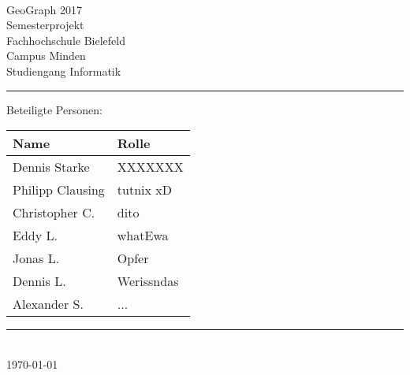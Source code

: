 


\begin{titlepage}
   \mbox{}\vspace{5\baselineskip}\\
   \sffamily\huge
   \centering
   {\Huge GeoGraph 2017} \\
   \normalsize Semesterprojekt
   \vspace{3\baselineskip}\\
   \rmfamily\Large
  Fachhochschule Bielefeld \\
  Campus Minden \\
  Studiengang Informatik
   \vspace{2\baselineskip}\\
\noindent\rule{15cm}{0.4pt}
Beteiligte Personen:
\begin{table}[H]
	\tablestyle
	\begin{tabular}{*{2}{v{0.45\textwidth}}}
		\hline
		\textbf{Name} &
		\textbf{Rolle} \tabularnewline
		\hline
		Dennis Starke  & XXXXXXX 	\tabularnewline
		Philipp Clausing  & tutnix xD 	\tabularnewline
		Christopher C. & dito 	\tabularnewline
		Eddy L. & whatEwa				\tabularnewline
		Jonas L. & Opfer				\tabularnewline
		Dennis L. & Werissndas 			\tabularnewline
		Alexander S. & ...		\tabularnewline

	\end{tabular}
\end{table}

   \noindent\rule{15cm}{0.4pt}
      \vspace{1\baselineskip}\\
   \today
\end{titlepage}

